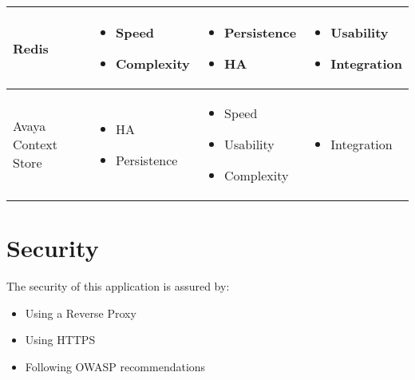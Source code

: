 \documentclass{article}
\begin{document}
\begin{longtable}[l]{ | p{} | p{} | p{} | p{} |}
		Redis
		&
		\begin{itemize}[label=\Checkmark]
			\item Speed
			\item Complexity
		\end{itemize}
		&
		\begin{itemize}[label=\XSolidBrush]
			\item Persistence
			\item HA
		\end{itemize}
		&
		\begin{itemize}[label=\SquareShadowBottomRight]
			\item Usability
			\item Integration
		\end{itemize}
		\\ \hline
		
		Avaya Context Store
		&
		\begin{itemize}[label=\Checkmark]
			\item HA
			\item Persistence
		\end{itemize}
		&
		\begin{itemize}[label=\XSolidBrush]
			\item Speed
			\item Usability
			\item Complexity
		\end{itemize}
		&
		\begin{itemize}[label=\SquareShadowBottomRight]
			\item Integration
		\end{itemize}
		\\ \hline
	\end{longtable}

	\section{Security}
	
	The security of this application is assured by:
	\begin{itemize}
		\item Using a Reverse Proxy
		\item Using HTTPS
		\item Following OWASP recommendations
	\end{itemize}
	
\end{document}
